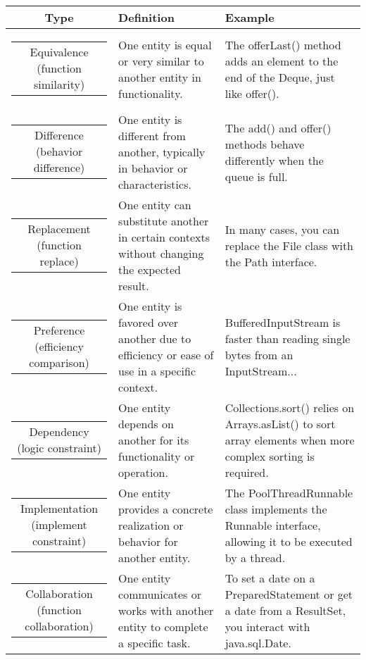 \begin{table*}[h]
\centering
\caption{The Details of the Relation Types in Our KG Schema.}
\begin{tabularx}{\textwidth}{@{}c|>{\centering\arraybackslash}X|>{\centering\arraybackslash}X@{}}
\hline
Type & Definition & Example \\ \hline
\begin{tabular}[c]{@{}c@{}}Equivalence (function similarity)\end{tabular} & One entity is equal or very similar to another entity in functionality. & The offerLast() method adds an element to the end of the Deque, just like offer(). \\ \hline
\begin{tabular}[c]{@{}c@{}}Difference (behavior difference)\end{tabular} & One entity is different from another, typically in behavior or characteristics. & The add() and offer() methods behave differently when the queue is full. \\ \hline
\begin{tabular}[c]{@{}c@{}}Replacement (function replace)\end{tabular} & One entity can substitute another in certain contexts without changing the expected result. & In many cases, you can replace the File class with the Path interface. \\ \hline
\begin{tabular}[c]{@{}c@{}}Preference (efficiency comparison)\end{tabular} & One entity is favored over another due to efficiency or ease of use in a specific context. & BufferedInputStream is faster than reading single bytes from an InputStream... \\ \hline
\begin{tabular}[c]{@{}c@{}}Dependency (logic constraint)\end{tabular} & One entity depends on another for its functionality or operation. & Collections.sort() relies on Arrays.asList() to sort array elements when more complex sorting is required. \\ \hline
\begin{tabular}[c]{@{}c@{}}Implementation (implement constraint)\end{tabular} & One entity provides a concrete realization or behavior for another entity. & The PoolThreadRunnable class implements the Runnable interface, allowing it to be executed by a thread. \\ \hline
\begin{tabular}[c]{@{}c@{}}Collaboration (function collaboration)\end{tabular} & One entity communicates or works with another entity to complete a specific task. & To set a date on a PreparedStatement or get a date from a ResultSet, you interact with java.sql.Date. \\ \hline

\end{tabularx}
\end{table*}
